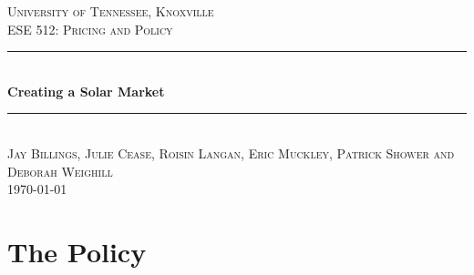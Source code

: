 \documentclass[10pt]{book} %
\begin{document}

\begin{titlepage}

\newcommand{\HRule}{\rule{\linewidth}{0.5mm}} %

\center %

\textsc{\LARGE University of Tennessee, Knoxville}\\[1.5cm] %
\textsc{\Large ESE 512: Pricing and Policy}\\[0.5cm] %

\HRule \\[0.4cm]
{ \huge \bfseries Creating a Solar Market}\\[0.4cm] %
\HRule \\[1.5cm]

\textsc{\large Jay Billings, Julie Cease, Roisin Langan, Eric Muckley, Patrick Shower and Deborah Weighill}\\[0.5cm] %





{\large \today}\\[3cm] %




\end{titlepage}





\chapter{The Policy}
\end{document}
